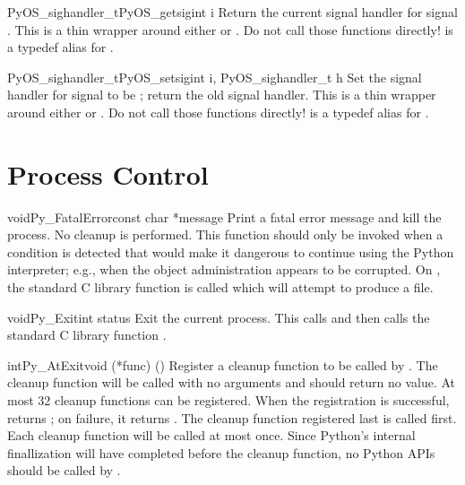 \begin{cfuncdesc}{PyOS_sighandler_t}{PyOS_getsig}{int i}
  Return the current signal handler for signal .  This is a
  thin wrapper around either  or
  .  Do not call those functions directly!
   is a typedef alias for .
\end{cfuncdesc}

\begin{cfuncdesc}{PyOS_sighandler_t}{PyOS_setsig}{int i, PyOS_sighandler_t h}
  Set the signal handler for signal  to be ; return the
  old signal handler.  This is a thin wrapper around either
   or .  Do not call those
  functions directly!   is a typedef alias
  for .
\end{cfuncdesc}


\section{Process Control \label{processControl}}

\begin{cfuncdesc}{void}{Py_FatalError}{const char *message}
  Print a fatal error message and kill the process.  No cleanup is
  performed.  This function should only be invoked when a condition is
  detected that would make it dangerous to continue using the Python
  interpreter; e.g., when the object administration appears to be
  corrupted.  On \UNIX, the standard C library function
   is called which will attempt to
  produce a  file.
\end{cfuncdesc}

\begin{cfuncdesc}{void}{Py_Exit}{int status}
  Exit the current process.  This calls
   and then calls the
  standard C library function
  .
\end{cfuncdesc}

\begin{cfuncdesc}{int}{Py_AtExit}{void (*func) ()}
  Register a cleanup function to be called by
  .  The cleanup
  function will be called with no arguments and should return no
  value.  At most 32 cleanup functions can be
  registered.  When the registration is successful,
   returns ; on failure, it returns
  .  The cleanup function registered last is called first.
  Each cleanup function will be called at most once.  Since Python's
  internal finallization will have completed before the cleanup
  function, no Python APIs should be called by .
\end{cfuncdesc}


